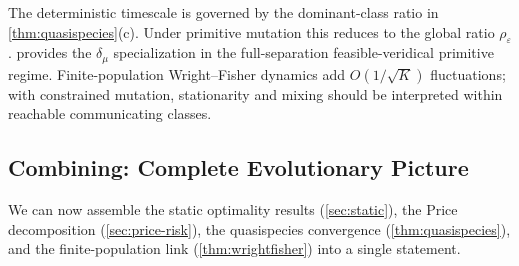 \documentclass[12pt]{article}
\newcommand{\dmu}{\delta_\mu}
\begin{document}
The deterministic timescale is governed by the dominant-class ratio in \cref{thm:quasispecies}(c). Under primitive mutation this reduces to the global ratio $\rho_\varepsilon$.  provides the $\dmu$ specialization in the full-separation feasible-veridical primitive regime. Finite-population Wright--Fisher dynamics add $O(1/\sqrt{K})$ fluctuations; with constrained mutation, stationarity and mixing should be interpreted within reachable communicating classes.

\subsection{Combining: Complete Evolutionary Picture}\label{sec:synthesis}

We can now assemble the static optimality results (\cref{sec:static}), the Price decomposition (\cref{sec:price-risk}), the quasispecies convergence (\cref{thm:quasispecies}), and the finite-population link (\cref{thm:wrightfisher}) into a single statement.
\end{document}
